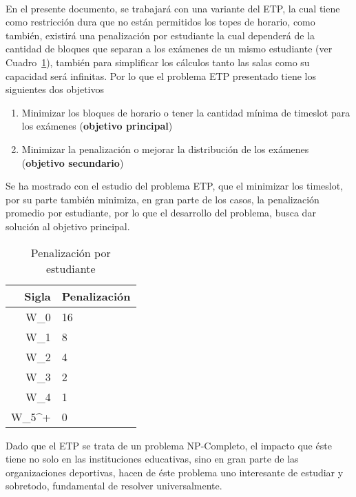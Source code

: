 \begin{itemize}
\end{itemize}
\\
En el presente documento, se trabajará con una variante del ETP, la cual tiene como restricción dura que no están permitidos los topes de horario, como también, existirá una penalización por estudiante la cual dependerá de la cantidad de bloques que separan a los exámenes de un mismo estudiante (ver Cuadro~\ref{tab:Penalizaciones}), también para simplificar los cálculos tanto las salas como su capacidad será infinitas. Por lo que el problema ETP presentado tiene los siguientes dos objetivos
\begin{center}
    \begin{enumerate}
    \item Minimizar los bloques de horario o tener la cantidad mínima de timeslot para los exámenes (\textbf{objetivo principal})
    \item Minimizar la penalización o mejorar la distribución de los exámenes (\textbf{objetivo secundario})
\end{enumerate}
\end{center}

Se ha mostrado con el estudio del problema ETP, que el minimizar los timeslot, por su parte también minimiza, en gran parte de los casos, la penalización promedio por estudiante, por lo que el desarrollo del problema, busca dar solución al objetivo principal.

\begin{table}[]
    \begin{center}
        \begin{tabular}{| r | l| }
        \hline
        \textbf{Sigla} & \textbf{Penalización} \\ \hline \hline
        W_0 & 16  \\ \hline
        W_1 & 8  \\ \hline
        W_2 & 4  \\ \hline
        W_3 & 2  \\ \hline
        W_4 & 1  \\ \hline
        W_5^+ & 0  \\ \hline
        \end{tabular}
        \caption{Penalización por estudiante \cite{Cita1}}
        \label{tab:Penalizaciones}
    \end{center}
\end{table}

\vspace{2mm}
Dado que el ETP se trata de un problema NP-Completo, el impacto que éste tiene no solo en las instituciones educativas, sino en gran parte de las organizaciones deportivas, hacen de éste problema uno interesante de estudiar y sobretodo, fundamental de resolver universalmente.

